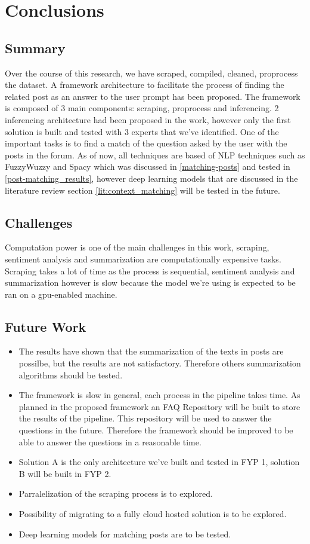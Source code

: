 \chapter{Conclusions}

\section{Summary}
Over the course of this research, we have scraped, compiled, cleaned, proprocess the dataset. A framework architecture to facilitate the process of finding the related post as an answer to the user prompt has been proposed. The framework is composed of 3 main components: scraping, proprocess and inferencing. 2 inferencing architecture had been proposed in the work, however only the first solution is built and tested with 3 experts that we've identified. One of the important tasks is to find a match of the question asked by the user with the posts in the forum. As of now, all techniques are based of NLP techniques such as FuzzyWuzzy and Spacy which was discussed in \ref{matching-posts} and tested in \ref{post-matching_results}, however deep learning models that are discussed in the literature review section \ref{lit:context_matching} will be tested in the future.

\section{Challenges}
Computation power is one of the main challenges in this work, scraping, sentiment analysis and summarization are computationally expensive tasks. Scraping takes a lot of time as the process is sequential, sentiment analysis and summarization however is slow because the model we're using is expected to be ran on a gpu-enabled machine. 

\section{Future Work}
\begin{itemize}
  \item The results have shown that the summarization of the texts in posts are possilbe, but the results are not satisfactory. Therefore others summarization algorithms should be tested.
  \item The framework is slow in general, each process in the pipeline takes time. As planned in the proposed framework an FAQ Repository will be built to store the results of the pipeline. This repository will be used to answer the questions in the future. Therefore the framework should be improved to be able to answer the questions in a reasonable time.
  \item Solution A is the only architecture we've built and tested in FYP 1, solution B will be built in FYP 2.
  \item Parralelization of the scraping process is to explored.
  \item Possibility of migrating to a fully cloud hosted solution is to be explored.
  \item Deep learning models for matching posts are to be tested.
\end{itemize}